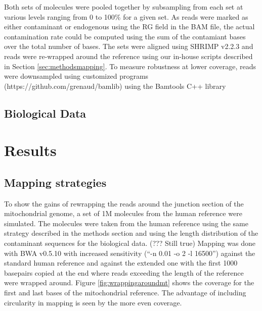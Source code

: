 \documentclass[a4paper,12pt]{article}
\begin{document}
\begin{itemize}
\begin{itemize}
Both sets of molecules were pooled together by subsampling from each set at various levels ranging from 0 to 100\% for a given set. As reads were marked as either contaminant or endogenous using the RG field in the BAM file, the actual contamination rate could be computed using the sum of the contamiant bases over the total number of bases. The sets were aligned using SHRIMP v2.2.3 and reads were re-wrapped around the reference using our in-house scripts described in Section \ref{sec:methodsmapping}. To measure robustness at lower coverage, reads were downsampled using customized programs (https://github.com/grenaud/bamlib) using the Bamtools C++ library \cite{barnett2011bamtools} 



\subsection{Biological Data}

% 


\clearpage






















\clearpage


\section{Results}


\subsection{Mapping strategies}

To show the gains of rewrapping the reads around the junction section of the mitochondrial genome, a set of 1M molecules from the human reference were simulated. The molecules were taken from the human reference using the same strategy described in the methods section and using the length distribution of the contaminant sequences for the biological data. (??? Still true) Mapping was done with BWA v0.5.10 with increased sensitivity (``-n 0.01 -o 2 -l 16500'') against the standard human reference and against the extended one with the first 1000 basepairs copied at the end where reads exceeding the length of the reference were wrapped around. Figure \ref{fig:wrappingaroundmt} shows the coverage for the first and last bases of the mitochondrial reference. The advantage of including circularity in mapping is seen by the more even coverage. 



\end{itemize}
\end{itemize}
\end{document}
